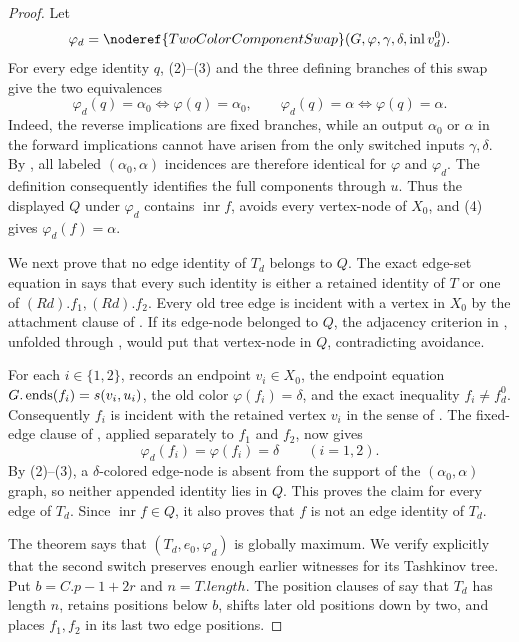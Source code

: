 \begin{proof}
Let
\[
 \varphi_d=\noderef{TwoColorComponentSwap}
   (G,\varphi,\gamma,\delta,\operatorname{inl}v^0_d).
\]
For every edge identity $q$, (2)--(3) and the three defining branches of
this swap give the two equivalences
\[
 \varphi_d(q)=\alpha_0\iff\varphi(q)=\alpha_0,
 \qquad
 \varphi_d(q)=\alpha\iff\varphi(q)=\alpha.                 \tag{4}
\]
Indeed, the reverse implications are fixed branches, while an output
$\alpha_0$ or $\alpha$ in the forward implications cannot have arisen
from the only switched inputs $\gamma,\delta$.  By
, all labeled
$(\alpha_0,\alpha)$ incidences are therefore identical for $\varphi$ and
$\varphi_d$.  The definition  consequently
identifies the full components through $u$.  Thus the displayed $Q$ under
$\varphi_d$ contains $\operatorname{inr}f$, avoids every vertex-node of
$X_0$, and (4) gives $\varphi_d(f)=\alpha$.

We next prove that no edge identity of $T_d$ belongs to $Q$.  The exact
edge-set equation in  says that every
such identity is either a retained identity of $T$ or one of
$(R d).f_1,(R d).f_2$.  Every old tree edge is incident with a vertex in
$X_0$ by the attachment clause of .  If its
edge-node belonged to $Q$, the adjacency criterion in
, unfolded through ,
would put that vertex-node in $Q$, contradicting avoidance.

For each $i\in\{1,2\}$,  records an
endpoint $v_i\in X_0$, the endpoint equation
$G.\mathop{\rm ends}(f_i)=s(v_i,u_i)$, the old color
$\varphi(f_i)=\delta$, and the exact inequality $f_i\ne f^0_d$.
Consequently $f_i$ is incident with the retained vertex $v_i$ in the
sense of .  The fixed-edge clause of
, applied separately to $f_1$ and
$f_2$, now gives
\[
 \varphi_d(f_i)=\varphi(f_i)=\delta\qquad(i=1,2).           \tag{5}
\]
By (2)--(3), a $\delta$-colored edge-node is absent from the support of
the $(\alpha_0,\alpha)$ graph, so neither appended identity lies in $Q$.
This proves the claim for every edge of $T_d$.  Since
$\operatorname{inr}f\in Q$, it also proves that $f$ is not an edge
identity of $T_d$.

The theorem  says that
$(T_d,e_0,\varphi_d)$ is globally maximum.  We verify explicitly that the
second switch preserves enough earlier witnesses for its Tashkinov tree.
Put $b=C.p-1+2r$ and $n=T.length$.  The position clauses of
 say that $T_d$ has length $n$, retains
positions below $b$, shifts later old positions down by two, and places
$f_1,f_2$ in its last two edge positions.


\end{proof}
